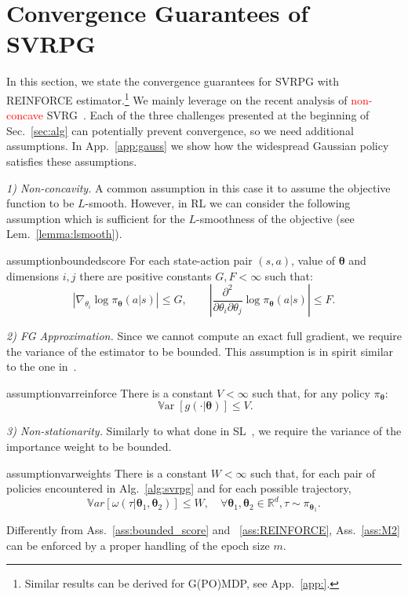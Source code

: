 \documentclass{article}
\theoremstyle{remark}
\theoremstyle{definition}
\newcommand{\realspace}{\mathbb R}      %
\DeclareMathOperator*{\Var}{\mathbb{V}ar}
\newcommand{\vtheta}{\boldsymbol{\theta}}
\newcommand{\pol}{\pi_{\vtheta}}
\newcommand{\VARRF}{V}
\newcommand{\GRADLOG}{G}
\newcommand{\VARIS}{W}
\newcommand{\HESSLOG}{F}
\begin{document}
\section{Convergence Guarantees of SVRPG}\label{sec:conv}
In this section, we state the convergence guarantees for SVRPG {\color{red}with REINFORCE estimator}.\footnote{\color{red}Similar results can be derived for G(PO)MDP, see App.~\ref{app:}.}
We mainly leverage on the recent analysis of \textcolor{red}{non-concave} SVRG~\cite{reddi2016stochastic,allen2016variance}.
Each of the three challenges presented at the beginning of Sec.~\ref{sec:alg} can potentially prevent convergence, so we need additional assumptions.
In App.~\ref{app:gauss} we show how the widespread Gaussian policy satisfies these assumptions.

\textit{1) Non-concavity.} A common assumption in this case it to assume the objective function to be $L$-smooth.
However, in RL we can consider the following assumption which is sufficient for the $L$-smoothness of the objective (see Lem.~\ref{lemma:lsmooth}).
	\begin{restatable}{assumption}{boundedscore}\label{ass:bounded_score}
		For each state-action pair $(s,a)$, value of $\vtheta$ and dimensions $i,j$ there are positive constants $G,F<\infty$ such that:
\[
		\left|\nabla_{\theta_i}\log\pi_{\vtheta}(a\vert s)\right| \leq \GRADLOG, \qquad
        \left|\frac{\partial^2}{\partial\theta_i\partial\theta_j}\log\pi_{\vtheta}(a \vert s)\right| \leq \HESSLOG.
\]
	\end{restatable}

\textit{2) FG Approximation.}
Since we cannot compute an exact full gradient, we require the variance of the estimator to be bounded.
This assumption is in spirit similar to the one in~\citep{harikandeh2015stopwasting}.
	\begin{restatable}{assumption}{varreinforce}\label{ass:REINFORCE}
		There is a constant $V<\infty$ such that, for any policy $\pol$:
		\[
			\Var\left[g(\cdot\vert\vtheta)\right] \leq \VARRF.
		\]
	\end{restatable}

\textit{3) Non-stationarity.} 
Similarly to what done in SL~\citep{cortes2010learning}, we require the variance of the importance weight to be bounded.
	\begin{restatable}{assumption}{varweights}\label{ass:M2}
		There is a constant $W<\infty$ such that, for each pair of policies encountered in Alg.~\ref{alg:svrpg} and for each possible trajectory,
		\[
                \mathbb{V}ar\left[\omega(\tau| \vtheta_1, \vtheta_2)\right] \leq \VARIS, \quad \forall \vtheta_1,\vtheta_2 \in \realspace^d , \tau \sim \pi_{\vtheta_1}.
		\]
	\end{restatable}
Differently from Ass.~\ref{ass:bounded_score} and ~\ref{ass:REINFORCE}, Ass.~\ref{ass:M2} can be enforced by a proper handling of the epoch size $m$.
\end{document}
